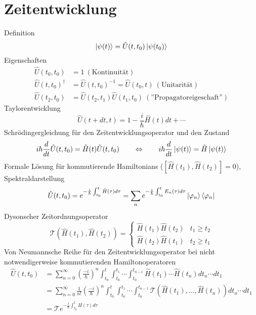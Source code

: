 \section{Zeitentwicklung}

Definition \cite[Glg. 3.2]{qm}
\begin{equation*}
    \ket{\psi(t)} = \hat{U}(t, t_0)\ket{\psi(t_0)}
\end{equation*}
Eigenschaften \cite[S. 56, Glg 3.3, 3.4]{qm}
\begin{align*}
	\hat{U}(t_0, t_0) &= 1 \ (\text{Kontinuität}) \\
	\hat{U}(t, t_0)^\dagger &= \hat{U}(t, t_0)^{-1}=\hat{U}(t_0, t) \ (\text{Unitarität}) \\
	\hat{U}(t_2, t_0) &= \hat{U}(t_2, t_1)\hat{U}(t_1, t_0) \ (\text{''Propagatoreigeschaft''})
\end{align*}
Taylorentwicklung \cite[Glg. 3.4]{qm}
\begin{equation*}
    \hat{U}(t+dt,t) = 1-\frac{i}{\hbar}\hat{H}(t)dt+\cdots
\end{equation*}
Schrödingergleichung für den Zeitentwicklungsoperator und den Zustand \cite[Glg. 3.5, 3.15]{qm}
\begin{equation*}
    i\hbar\frac{d}{dt}\hat{U}(t,t_0)=\hat{H}(t)\hat{U}(t,t_0) \qquad \Leftrightarrow \qquad  i\hbar\frac{d}{dt}\ket{\psi(t)}=\hat{H}\ket{\psi(t)}
\end{equation*}
Formale Lösung für kommutierende Hamiltonians ($[\hat{H}(t_1), \hat{H}(t_2)]=0$), Spektraldarstellung \cite[Glg. 3.9]{qm}
\begin{equation*}
    \hat{U}(t, t_0) = e^{-\frac{i}{\hbar}\int_{t_0}^t\hat{H}(\tau)d\tau} = \sum_n e^{-\frac{i}{\hbar}\int_{t_0}^tE_n(\tau)d\tau}\ket{\varphi_n}\bra{\varphi_n}
\end{equation*}
Dysonscher Zeitordnungsoperator \cite[Glg. A.196]{qm}
\begin{equation*}
	\mathcal{T}\left(\hat{H}(t_1),\hat{H}(t_2)\right) = \begin{cases}
		\hat{H}(t_1)\hat{H}(t_2) & t_1 \geq t_2 \\
		\hat{H}(t_2)\hat{H}(t_1) & t_2 \geq t_1
	\end{cases}
\end{equation*}
Von Neumannsche Reihe für den Zeitentwicklungsoperator bei nicht notwendigerweise kommutierenden Hamiltonoperatoren \cite[Glg. A.194]{qm}
\begin{align*}
	\hat{U}(t,t_0) &= \sum_{n=0}^\infty\left(\frac{-i}{\hbar}\right)^n\int_{t_0}^t\int_{t_0}^{t_1}\cdots\int_{t_0}^{t_{n-1}}\hat{H}(t_1)\cdots\hat{H}(t_n)dt_n\cdots dt_1 \\
	&= \sum_{n=0}^\infty\frac{1}{n!}\left(\frac{-i}{\hbar}\right)^n\int_{t_0}^t\int_{t_0}^{t_1}\cdots\int_{t_0}^{t_{n-1}}\mathcal{T}\left(\hat{H}(t_1),\dots,\hat{H}(t_n)\right)dt_n\cdots dt_1 \\
	&= \mathcal{T}e^{-\frac{i}{\hbar}\int_{t_0}^t\hat{H}(\tau)d\tau}
\end{align*}

